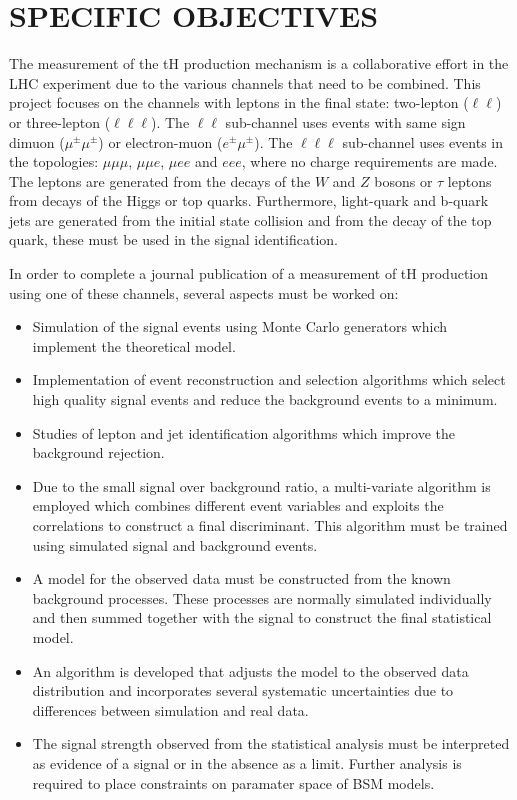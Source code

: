 \documentclass[final,3p]{CSP}
\begin{document}
\section{SPECIFIC OBJECTIVES}

\onehalfspacing The measurement of the tH production mechanism is a collaborative effort in the LHC experiment due to the various channels that need to be combined.
This project focuses on the channels with leptons in the final state: two-lepton ($\ell\ell$) or three-lepton ($\ell\ell\ell$).
The $\ell\ell$ sub-channel uses events with same sign dimuon ($\mu^\pm\mu^\pm$) or electron-muon ($e^\pm\mu^\pm$).
The $\ell\ell\ell$ sub-channel uses events in the topologies: $\mu\mu\mu$, $\mu\mu e$, $\mu e e$ and $e e e$, where no charge requirements are made.
The leptons are generated from the decays of the $W$ and $Z$ bosons or $\tau$ leptons from decays of the Higgs or top quarks.
Furthermore, light-quark and b-quark jets are generated from the initial state collision and from the decay of the top quark, these must be used in the signal identification.

In order to complete a journal publication of a  measurement of tH production using one of these channels, several aspects  must be worked on:
\begin{itemize}
\item Simulation of the signal events using Monte Carlo generators which implement the theoretical model.
\item Implementation of event reconstruction and selection algorithms which select high quality signal events and reduce the background events to a minimum.
\item Studies of lepton and jet identification algorithms which improve the background rejection.
\item Due to the small signal over background ratio, a multi-variate algorithm is employed which combines different event variables and exploits the correlations to construct a final discriminant. This algorithm must be trained using simulated signal and background events.
\item A model for the observed data must be constructed from the known background processes. These processes are normally simulated individually and then summed together with the signal to construct the final statistical model.
\item An algorithm is developed that adjusts the model to the observed data distribution and incorporates several systematic uncertainties due to differences between simulation and real data.
\item The signal strength observed from the statistical analysis must be interpreted as evidence of a signal or in the absence as a limit. Further analysis is required to place constraints on paramater space of BSM models.
\end{itemize}
\end{document}

